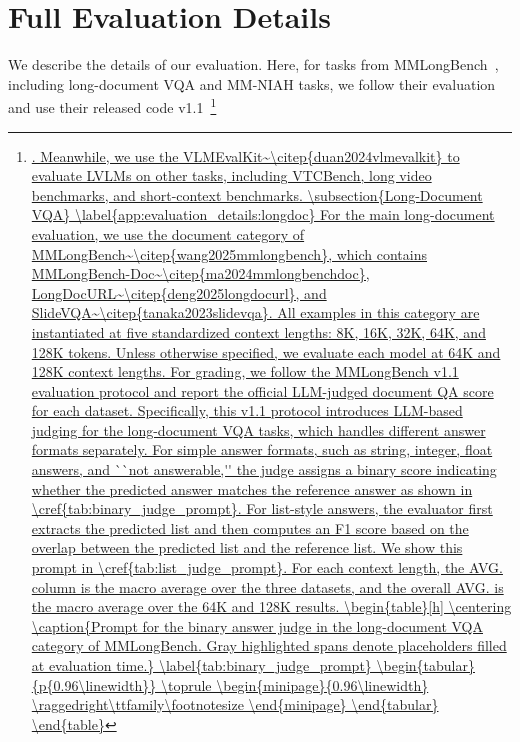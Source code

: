 \section{Full Evaluation Details}
\label{app:evaluation_details}
We describe the details of our evaluation. Here, for tasks from MMLongBench~\citep{wang2025mmlongbench}, including long-document VQA and MM-NIAH tasks, we follow their evaluation and use their released code v1.1~\footnote{\url{.
Meanwhile, we use the VLMEvalKit~\citep{duan2024vlmevalkit} to evaluate LVLMs on other tasks, including VTCBench, long video benchmarks, and short-context benchmarks.


\subsection{Long-Document VQA}
\label{app:evaluation_details:longdoc}
For the main long-document evaluation, we use the document category of MMLongBench~\citep{wang2025mmlongbench}, which contains MMLongBench-Doc~\citep{ma2024mmlongbenchdoc}, LongDocURL~\citep{deng2025longdocurl}, and SlideVQA~\citep{tanaka2023slidevqa}.
All examples in this category are instantiated at five standardized context lengths: 8K, 16K, 32K, 64K, and 128K tokens.
Unless otherwise specified, we evaluate each model at 64K and 128K context lengths.

For grading, we follow the MMLongBench v1.1 evaluation protocol and report the official LLM-judged document QA score for each dataset.
Specifically, this v1.1 protocol introduces LLM-based judging for the long-document VQA tasks, which handles different answer formats separately.
For simple answer formats, such as string, integer, float answers, and ``not answerable,'' the judge assigns a binary score indicating whether the predicted answer matches the reference answer as shown in \cref{tab:binary_judge_prompt}.
For list-style answers, the evaluator first extracts the predicted list and then computes an F1 score based on the overlap between the predicted list and the reference list. We show this prompt in \cref{tab:list_judge_prompt}.
For each context length, the AVG. column is the macro average over the three datasets, and the overall AVG. is the macro average over the 64K and 128K results.

\begin{table}[h]
 \centering
 \caption{Prompt for the binary answer judge in the long-document VQA category of MMLongBench. Gray highlighted spans denote placeholders filled at evaluation time.}
 \label{tab:binary_judge_prompt}
 \begin{tabular}{p{0.96\linewidth}}
 \toprule
 \begin{minipage}{0.96\linewidth}
 \raggedright\ttfamily\footnotesize



\end{minipage}
\end{tabular}
\end{table}}}
